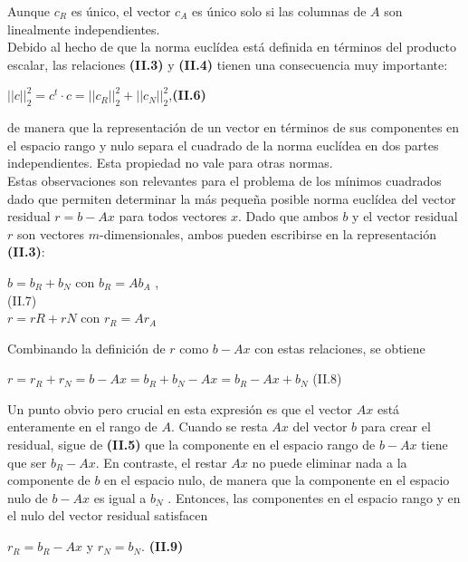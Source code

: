 \documentclass[twocolumn,twoside]{article}
\begin{document}
Aunque $c_R$ es \'unico, el vector $c_A$ es \'unico solo si las columnas de $A$ son linealmente
independientes.\\
Debido al hecho de que la norma eucl\'idea est\'a definida en t\'erminos del producto
escalar, las relaciones \textbf{(II.3)} y \textbf{(II.4)} tienen una consecuencia muy importante:
\begin{center}
  $||c||_2^2 = c^t\cdot c = ||c_R ||_2^2 + ||c_N ||_2^2$,\hspace{0.5cm}\textbf{(II.6)}
\end{center}

de manera que la representaci\'on de un vector en t\'erminos de sus componentes en el espacio
rango y nulo separa el cuadrado de la norma eucl\'idea en dos partes independientes. Esta
propiedad no vale para otras normas.\\
Estas observaciones son relevantes para el problema de los m\'inimos cuadrados dado
que permiten determinar la m\'as peque\~na posible norma eucl\'idea del vector residual $r =b - A x$ para
todos vectores $x$. Dado que ambos $b$ y el vector residual $r$ son vectores
$m$-dimensionales, ambos pueden escribirse en la representaci\'on \textbf{(II.3)}:
\begin{center}
 $ b = b_R + b_N$ con $b_R = Ab_A$ ,\\
             \hspace{6cm}   (II.7)\\
$r = r R + r N$ con $r_R = A r_A$ 

\end{center}

Combinando la definici\'on de $r$ como $b - A x$ con estas relaciones, se obtiene
\begin{center}
  $r = r_R + r_N = b - A x = b_R + b_N - A x= b_R - Ax + b_N$ \hspace{2cm}(II.8)
\end{center}

Un punto obvio pero crucial en esta expresi\'on es que el vector $A x$ est\'a enteramente en
el rango de $A$. Cuando se resta $A x$ del vector $b$ para crear el residual, sigue de \textbf{(II.5)}
que la componente en el espacio rango de $b - A x$ tiene que ser $b_R - A x$. En contraste,
el restar $A x$ no puede eliminar nada a la componente de $b$ en el espacio nulo, de manera
que la componente en el espacio nulo de $b-A x$ es igual a $b_N$ . Entonces, las componentes
en el espacio rango y en el nulo del vector residual satisfacen
\begin{center}
  $r_R = b_R - A x$ y $r_N = b_N$. \textbf{(II.9)}
\end{center}
\end{document}
